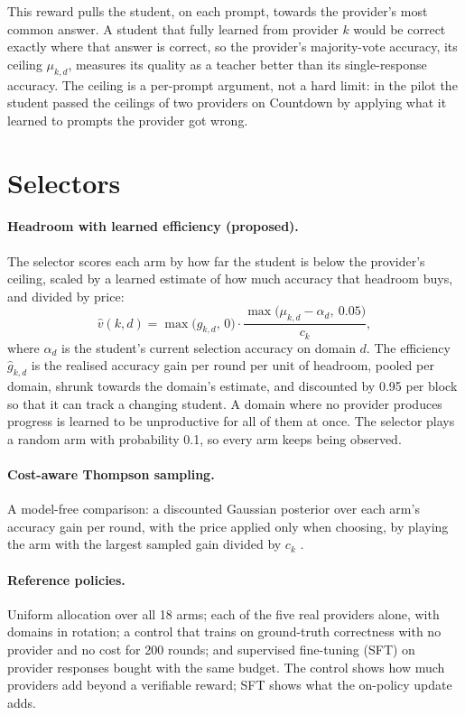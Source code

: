 This reward pulls the student, on each prompt, towards the provider's most common answer.
A student that fully learned from provider $k$ would be correct exactly where that answer
is correct, so the provider's majority-vote accuracy, its ceiling $\mu_{k,d}$, measures its
quality as a teacher better than its single-response accuracy. The ceiling is a per-prompt
argument, not a hard limit: in the pilot the student passed the ceilings of two providers
on Countdown by applying what it learned to prompts the provider got wrong.

\section{Selectors}
\label{ca:sec:selectors}

\paragraph{Headroom with learned efficiency (proposed).} The selector scores each arm by
how far the student is below the provider's ceiling, scaled by a learned estimate of how
much accuracy that headroom buys, and divided by price:
\[
  \hat{v}(k, d) = \max\big(\hat{g}_{k,d},\, 0\big) \cdot
                  \frac{\max\big(\mu_{k,d} - \alpha_d,\ 0.05\big)}{c_k},
\]
where $\alpha_d$ is the student's current selection accuracy on domain $d$. The efficiency
$\hat{g}_{k,d}$ is the realised accuracy gain per round per unit of headroom, pooled per
domain, shrunk towards the domain's estimate, and discounted by 0.95 per block so that it
can track a changing student. A domain where no provider produces progress is learned to
be unproductive for all of them at once. The selector plays a random arm with probability
0.1, so every arm keeps being observed.

\paragraph{Cost-aware Thompson sampling.} A model-free comparison: a discounted Gaussian
posterior over each arm's accuracy gain per round, with the price applied only when
choosing, by playing the arm with the largest sampled gain divided by $c_k$
\autocite{xia_budgeted_ts_2015,raj_dts_2017}.

\paragraph{Reference policies.} Uniform allocation over all 18 arms; each of the five real
providers alone, with domains in rotation; a control that trains on ground-truth
correctness with no provider and no cost for 200 rounds; and supervised fine-tuning (SFT)
on provider responses bought with the same budget. The control shows how much providers
add beyond a verifiable reward; SFT shows what the on-policy update adds.

